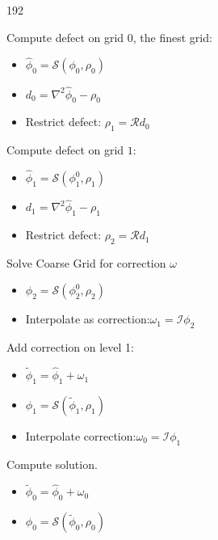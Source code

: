 \begin{dingautolist}{192}
			\item Compute defect on grid \(0\), the finest grid:
		\begin{itemize}
			\item	\( \widehat{\phi}_0 = \mathcal{S}(\phi_0, \rho_0)\)
			\item 	\(d_0 = \nabla^2\widehat{\phi}_0 - \rho_0\)
			\item Restrict defect: \(\rho_1 = \mathcal{R}d_0 \) \nonumber
		\end{itemize}
	\item Compute defect on grid \(1\):
		\begin{itemize}
			\item \(\widehat{\phi}_1 = \mathcal{S}(\phi_1^0, \rho_1)\)
			\item \(d_1 = \nabla^2\widehat{\phi}_1 - \rho_1 \)
			\item Restrict defect: \(\rho_2 = \mathcal{R}d_1 \)
		\end{itemize}
	\item Solve Coarse Grid for correction \(\omega\)
		\begin{itemize}
			\item \( \phi_2 = \mathcal{S}(\phi_2^0, \rho_2)\)
			\item Interpolate as correction:\(\omega_1 = \mathcal{I}\phi_2\)
		\end{itemize}
	\item Add correction on level 1:
		\begin{itemize}
			\item \(\widetilde{\phi}_1 = \widehat{\phi}_1 + \omega_1\)
			\item \( \phi_1 = \mathcal{S}(\widetilde{\phi}_1, \rho_1)  \)
			\item Interpolate correction:\( \omega_0 = \mathcal{I} \phi_1\)
		\end{itemize}
	\item Compute solution.
		\begin{itemize}
			\item \(\widetilde{\phi}_0 = \widehat{\phi}_0 + \omega_0\)
			\item \( \phi_0 = \mathcal{S}(\widetilde{\phi}_0, \rho_0)  \)
		\end{itemize}
\end{dingautolist}
%
